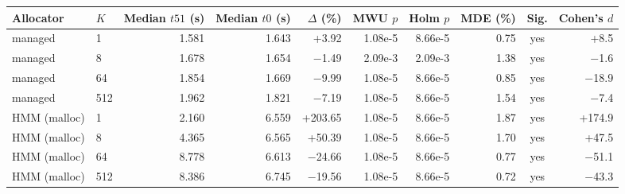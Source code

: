 \begin{tabular}{@{}llrrrrrrcr@{}}
\toprule
Allocator & $K$ & Median $t51$ (s) & Median $t0$ (s) & $\Delta$ (\%) & MWU $p$ & Holm $p$ & MDE (\%) & Sig. & Cohen's $d$ \\
\midrule
managed & 1 & 1.581 & 1.643 & +3.92 & 1.08e-5 & 8.66e-5 & 0.75 & yes & +8.5 \\ %
managed & 8 & 1.678 & 1.654 & $-$1.49 & 2.09e-3 & 2.09e-3 & 1.38 & yes & $-$1.6 \\ %
managed & 64 & 1.854 & 1.669 & $-$9.99 & 1.08e-5 & 8.66e-5 & 0.85 & yes & $-$18.9 \\ %
managed & 512 & 1.962 & 1.821 & $-$7.19 & 1.08e-5 & 8.66e-5 & 1.54 & yes & $-$7.4 \\ %
HMM (malloc) & 1 & 2.160 & 6.559 & +203.65 & 1.08e-5 & 8.66e-5 & 1.87 & yes & +174.9 \\ %
HMM (malloc) & 8 & 4.365 & 6.565 & +50.39 & 1.08e-5 & 8.66e-5 & 1.70 & yes & +47.5 \\ %
HMM (malloc) & 64 & 8.778 & 6.613 & $-$24.66 & 1.08e-5 & 8.66e-5 & 0.77 & yes & $-$51.1 \\ %
HMM (malloc) & 512 & 8.386 & 6.745 & $-$19.56 & 1.08e-5 & 8.66e-5 & 0.72 & yes & $-$43.3 \\ %
\bottomrule
\end{tabular}
